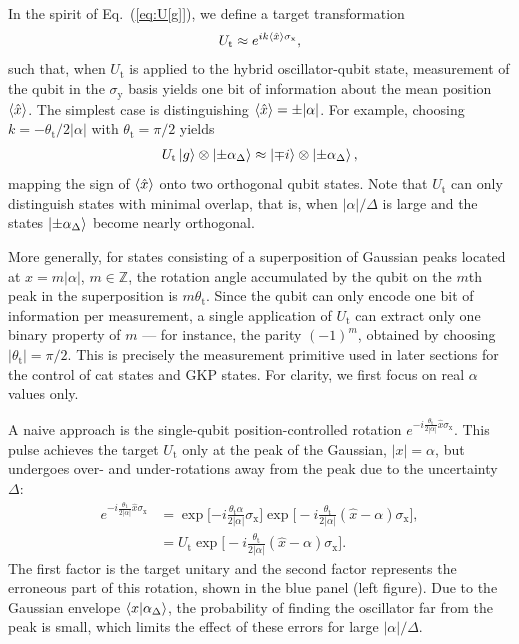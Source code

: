 \documentclass[aps,prx,showpacs,notitlepage,twocolumn,superscriptaddress,nofootinbib,preprintnumbers,floatfix,10pt, longbibliography]{revtex4-2}
\begin{document}
In the spirit of Eq.~(\ref{eq:U[g]}), we define a target transformation
\begin{align}
    U_\mathrm{t} \approx e^{ik\braket{\hat{x}}\sigma_\mathrm{x}}, \label{eq:targetU}
\end{align}
such that, when $U_\mathrm{t}$ is applied to the hybrid oscillator-qubit state, measurement of the 
qubit in the $\sigma_\mathrm{y}$ basis yields one bit of information about the mean position 
$\braket{\hat{x}}$. The simplest case is distinguishing $\braket{\hat{x}} = \pm|\alpha|$. For example, choosing 
$k = -\theta_\mathrm{t}/2|\alpha|$ with $\theta_\mathrm{t} = \pi/2$ yields
\begin{align}
    U_\mathrm{t} \ket{g} \otimes \ket{\pm\alpha_\Delta} \approx \ket{\mp i} \otimes 
    \ket{\pm\alpha_\Delta}, \label{eq:checkU}
\end{align}
mapping the sign of $\braket{\hat{x}}$ onto two orthogonal qubit states. Note that $U_\mathrm{t}$ 
can only distinguish states with minimal overlap, that is, when $|\alpha|/\Delta$ is large and the 
states $\ket{\pm\alpha_\Delta}$ become nearly orthogonal.

More generally, for states consisting of a superposition of Gaussian peaks located at 
$x = m|\alpha|$, $m \in \mathbb{Z}$, the rotation angle accumulated by the qubit on the $m$th peak in the superposition is $m\theta_\mathrm{t}$. 
Since the qubit can only encode one bit of information per measurement, a single application of 
$U_\mathrm{t}$ can extract only one binary property of $m$ --- for instance, the parity 
$(-1)^m$, obtained by choosing $|\theta_\mathrm{t}| = \pi/2$. This is precisely the measurement 
primitive used in later sections for the control of cat states and GKP states. For clarity, we first focus on real 
$\alpha$ values only.

A naive approach is the single-qubit position-controlled rotation $e^{-i\frac{\theta_\mathrm{t}}{2|\alpha|}\hat x\sigma_\mathrm{x}}$. This pulse achieves the target $U_\mathrm{t}$ only at the peak of the Gaussian, $|x|=\alpha$, but undergoes over- and under-rotations away from the peak due to the uncertainty $\Delta$:
\begin{align}
    e^{-i\frac{\theta_\mathrm{t}}{2|\alpha|}\hat x\sigma_\mathrm{x}}&=\exp\Bigg[{-i\frac{\theta_\mathrm{t}\alpha}{2|\alpha|}\sigma_\mathrm{x}\Bigg]\exp\Bigg[-i\frac{\theta_\mathrm{t}}{2|\alpha|}(\hat x-\alpha)\sigma_\mathrm{x}}\Bigg],\\
    &=U_\textrm{t}\exp\Bigg[-i\frac{\theta_\mathrm{t}}{2|\alpha|}(\hat x-\alpha)\sigma_\mathrm{x}\Bigg].
    \label{eq:cDerror}
\end{align}
The first factor is the target unitary and the second factor represents the erroneous part of this rotation, shown in the blue panel (left figure). Due to the Gaussian envelope $\braket{x|\alpha_\Delta}$, the probability of finding the oscillator far from the peak is small, which limits the effect of these errors for large $|\alpha|/\Delta$. 
\end{document}
